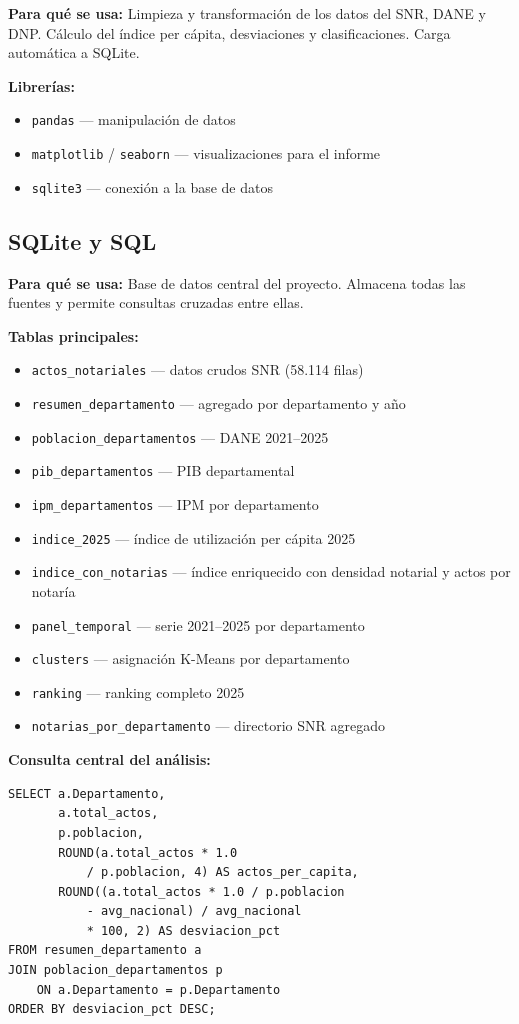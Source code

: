 \documentclass{article}
\begin{document}
\textbf{Para qué se usa:} Limpieza y transformación 
de los datos del SNR, DANE y DNP. Cálculo del índice 
per cápita, desviaciones y clasificaciones. Carga 
automática a SQLite.

\textbf{Librerías:}
\begin{itemize}
    \item \texttt{pandas} — manipulación de datos
    \item \texttt{matplotlib} / \texttt{seaborn} — 
    visualizaciones para el informe
    \item \texttt{sqlite3} — conexión a la base de datos
\end{itemize}

\subsection{SQLite y SQL}

\textbf{Para qué se usa:} Base de datos central del 
proyecto. Almacena todas las fuentes y permite 
consultas cruzadas entre ellas.

\textbf{Tablas principales:}
\begin{itemize}
    \item \texttt{actos\_notariales} — datos crudos SNR (58.114 filas)
    \item \texttt{resumen\_departamento} — agregado por departamento y año
    \item \texttt{poblacion\_departamentos} — DANE 2021--2025
    \item \texttt{pib\_departamentos} — PIB departamental
    \item \texttt{ipm\_departamentos} — IPM por departamento
    \item \texttt{indice\_2025} — índice de utilización per cápita 2025
    \item \texttt{indice\_con\_notarias} — índice enriquecido con
    densidad notarial y actos por notaría
    \item \texttt{panel\_temporal} — serie 2021--2025 por departamento
    \item \texttt{clusters} — asignación K-Means por departamento
    \item \texttt{ranking} — ranking completo 2025
    \item \texttt{notarias\_por\_departamento} — directorio SNR agregado
\end{itemize}

\textbf{Consulta central del análisis:}
\begin{verbatim}
SELECT a.Departamento,
       a.total_actos,
       p.poblacion,
       ROUND(a.total_actos * 1.0 
           / p.poblacion, 4) AS actos_per_capita,
       ROUND((a.total_actos * 1.0 / p.poblacion 
           - avg_nacional) / avg_nacional 
           * 100, 2) AS desviacion_pct
FROM resumen_departamento a
JOIN poblacion_departamentos p 
    ON a.Departamento = p.Departamento
ORDER BY desviacion_pct DESC;
\end{verbatim}
\end{document}
